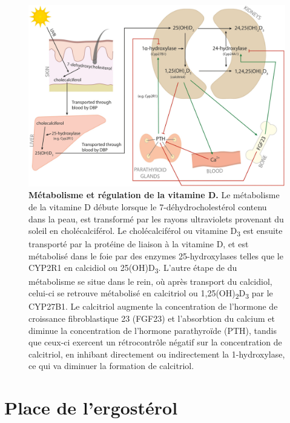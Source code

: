\documentclass[
  a4paper,
  DIV=11,
  numbers=noendperiod,
  listof=totoc]{scrreprt}
\begin{document}
\begin{figure}
\includegraphics{figures/vitamin-d-metabolism-regulation.jpg} 
\caption[\textbf{Métabolisme et régulation de la vitamine D.}]{\textbf{Métabolisme et régulation de la vitamine D.} Le métabolisme de la vitamine D débute lorsque le 7-déhydrocholestérol contenu dans la peau, est transformé par les rayons ultraviolets provenant du soleil en cholécalciférol. Le cholécalciférol ou vitamine D\textsubscript{3} est ensuite transporté par la protéine de liaison à la vitamine D, et est métabolisé dans le foie par des enzymes 25-hydroxylases telles que le CYP2R1 en calcidiol ou 25(OH)D\textsubscript{3}. L'autre étape de du métabolisme se situe dans le rein, où après transport du calcidiol, celui-ci se retrouve métabolisé en calcitriol ou 1,25(OH)\textsubscript{2}D\textsubscript{3} par le CYP27B1. Le calcitriol augmente la concentration de l'hormone de croissance fibroblastique 23 (FGF23) et l'absorbtion du calcium et diminue la concentration de l'hormone parathyroïde (PTH), tandis que ceux-ci exercent un rétrocontrôle négatif sur la concentration de calcitriol, en inhibant directement ou indirectement la 1-hydroxylase, ce qui va diminuer la formation de calcitriol. \cite{Dankers.2017}}
\label{fig:reg-vitd}
\end{figure}

\hypertarget{place-de-lergostuxe9rol}{%
\section{Place de l'ergostérol}\label{place-de-lergostuxe9rol}}
\end{document}
